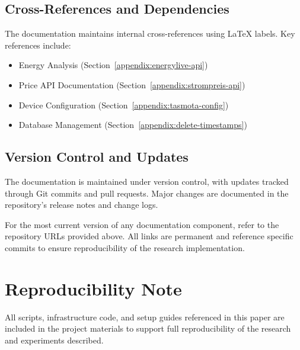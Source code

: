 \subsection{Cross-References and Dependencies}
The documentation maintains internal cross-references using LaTeX labels. Key references include:
\begin{itemize}
    \item Energy Analysis (Section~\ref{appendix:energylive-api})
    \item Price API Documentation (Section~\ref{appendix:strompreis-api})
    \item Device Configuration (Section~\ref{appendix:tasmota-config})
    \item Database Management (Section~\ref{appendix:delete-timestamps})
\end{itemize}

\subsection{Version Control and Updates}
The documentation is maintained under version control, with updates tracked through Git commits and pull requests. Major changes are documented in the repository's release notes and change logs.

For the most current version of any documentation component, refer to the repository URLs provided above. All links are permanent and reference specific commits to ensure reproducibility of the research implementation.

\section*{Reproducibility Note}
All scripts, infrastructure code, and setup guides referenced in this paper are included in the project materials to support full reproducibility of the research and experiments described.
